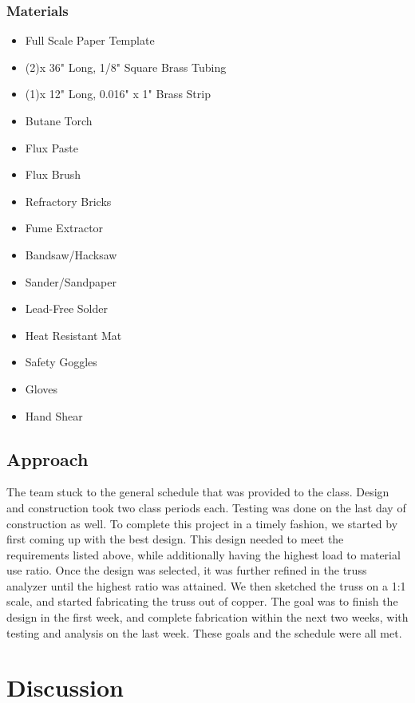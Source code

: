 \documentclass{article}
\let\Oldsection\section
\renewcommand{\section}{\FloatBarrier\Oldsection}
\let\Oldsubsection\subsection
\renewcommand{\subsection}{\FloatBarrier\Oldsubsection}
\let\Oldsubsubsection\subsubsection
\renewcommand{\subsubsection}{\FloatBarrier\Oldsubsubsection}
\begin{document}
\subsubsection{Materials}
\begin{itemize}
\item Full Scale Paper Template
\item (2)x 36" Long, 1/8" Square Brass Tubing
\item (1)x 12" Long, 0.016" x 1" Brass Strip
\item Butane Torch
\item Flux Paste
\item Flux Brush
\item Refractory Bricks
\item Fume Extractor
\item Bandsaw/Hacksaw
\item Sander/Sandpaper
\item Lead-Free Solder
\item Heat Resistant Mat
\item Safety Goggles
\item Gloves
\item Hand Shear
\end{itemize}

\subsection{Approach}

The team stuck to the general schedule that was provided to the class. Design and construction took two class periods each. Testing was done on the last day of construction as well. To complete this project in a timely fashion, we started by first coming up with the best design. This design needed to meet the requirements listed above, while additionally having the highest load to material use ratio. Once the design was selected, it was further refined in the truss analyzer until the highest ratio was attained. We then sketched the truss on a 1:1 scale, and started fabricating the truss out of copper. The goal was to finish the design in the first week, and complete fabrication within the next two weeks, with testing and analysis on the last week. These goals and the schedule were all met.

\newpage

\section{Discussion}
\end{document}
